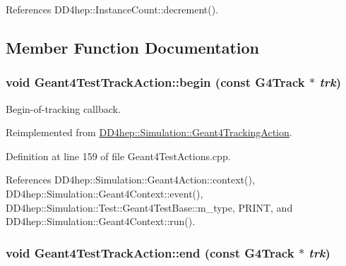 References DD4hep::InstanceCount::decrement().

\subsection{Member Function Documentation}
\hypertarget{class_d_d4hep_1_1_simulation_1_1_test_1_1_geant4_test_track_action_a461ee9be4bf51bcfac397d093fb55fb8}{
\subsubsection[{begin}]{\setlength{\rightskip}{0pt plus 5cm}void Geant4TestTrackAction::begin (const G4Track $\ast$ {\em trk})}}
\label{class_d_d4hep_1_1_simulation_1_1_test_1_1_geant4_test_track_action_a461ee9be4bf51bcfac397d093fb55fb8}


Begin-\/of-\/tracking callback. 

Reimplemented from \hyperlink{class_d_d4hep_1_1_simulation_1_1_geant4_tracking_action_a65858867a7b71bf4f48b9f140bc9a88d}{DD4hep::Simulation::Geant4TrackingAction}.

Definition at line 159 of file Geant4TestActions.cpp.

References DD4hep::Simulation::Geant4Action::context(), DD4hep::Simulation::Geant4Context::event(), DD4hep::Simulation::Test::Geant4TestBase::m\_\-type, PRINT, and DD4hep::Simulation::Geant4Context::run().\hypertarget{class_d_d4hep_1_1_simulation_1_1_test_1_1_geant4_test_track_action_a41bc0c1912089342579388ae2c176c69}{
\subsubsection[{end}]{\setlength{\rightskip}{0pt plus 5cm}void Geant4TestTrackAction::end (const G4Track $\ast$ {\em trk})}}
\label{class_d_d4hep_1_1_simulation_1_1_test_1_1_geant4_test_track_action_a41bc0c1912089342579388ae2c176c69}


